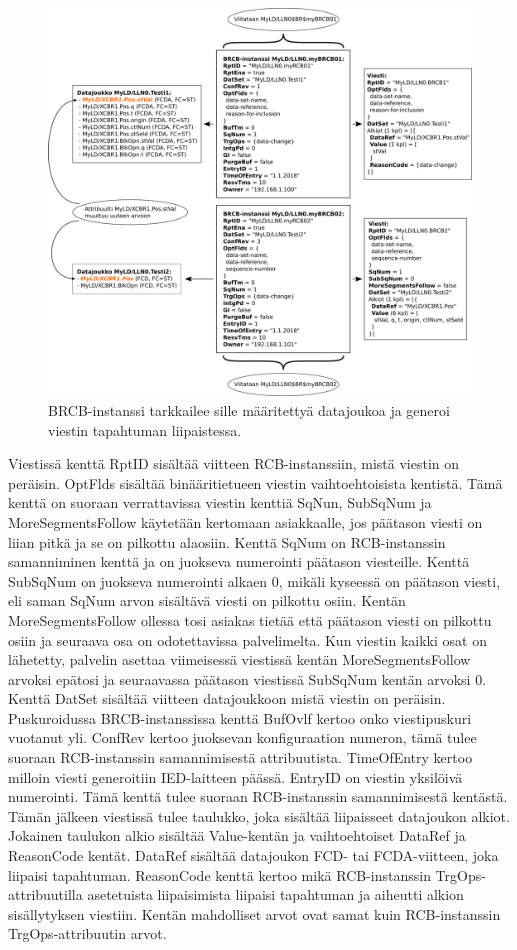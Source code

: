 \begin{figure}[ht!]
	\includegraphics[width=1\textwidth]{pictures/iec61850-data-set-reporting.png}
	\caption{BRCB-instanssi tarkkailee sille määritettyä datajoukoa ja generoi viestin tapahtuman liipaistessa.}
	\label{fig:iec61850-data-set-reporting}
\end{figure}

Viestissä kenttä RptID sisältää viitteen RCB-instanssiin, mistä viestin on peräisin. OptFlds sisältää binääritietueen viestin vaihtoehtoisista kentistä. Tämä kenttä on suoraan verrattavissa viestin kenttiä SqNun, SubSqNum ja MoreSegmentsFollow käytetään kertomaan asiakkaalle, jos päätason viesti on liian pitkä ja se on pilkottu alaosiin. Kenttä SqNum on RCB-instanssin samanniminen kenttä ja on juokseva numerointi päätason viesteille. Kenttä SubSqNum on juokseva numerointi alkaen 0, mikäli kyseessä on päätason viesti, eli saman SqNum arvon sisältävä viesti on pilkottu osiin. Kentän MoreSegmentsFollow ollessa tosi asiakas tietää että päätason viesti on pilkottu osiin ja seuraava osa on odotettavissa palvelimelta. Kun viestin kaikki osat on lähetetty, palvelin asettaa viimeisessä viestissä kentän MoreSegmentsFollow arvoksi epätosi ja seuraavassa päätason viestissä SubSqNum kentän arvoksi 0. Kenttä DatSet sisältää viitteen datajoukkoon mistä viestin on peräisin. Puskuroidussa BRCB-instanssissa kenttä BufOvlf kertoo onko viestipuskuri vuotanut yli. ConfRev kertoo juoksevan konfiguraation numeron, tämä tulee suoraan RCB-instanssin samannimisestä attribuutista. TimeOfEntry kertoo milloin viesti generoitiin IED-laitteen päässä. EntryID on viestin yksilöivä numerointi. Tämä kenttä tulee suoraan RCB-instanssin samannimisestä kentästä. Tämän jälkeen viestissä tulee taulukko, joka sisältää liipaisseet datajoukon alkiot. Jokainen taulukon alkio sisältää Value-kentän ja vaihtoehtoiset DataRef ja ReasonCode kentät. DataRef sisältää datajoukon FCD- tai FCDA-viitteen, joka liipaisi tapahtuman. ReasonCode kenttä kertoo mikä RCB-instanssin TrgOps-attribuutilla asetetuista liipaisimista liipaisi tapahtuman ja aiheutti alkion sisällytyksen viestiin. Kentän mahdolliset arvot ovat samat kuin RCB-instanssin TrgOps-attribuutin arvot.

